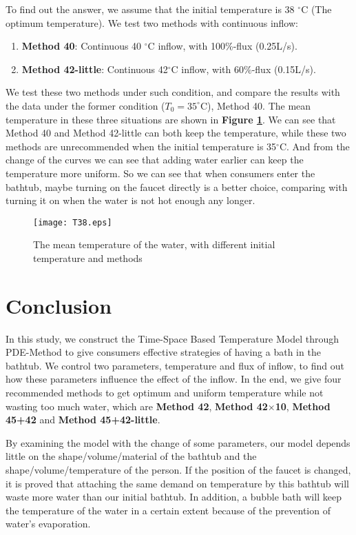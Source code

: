 \documentclass[12pt]{article}
\begin{document}
To find out the answer, we assume that the initial temperature is 38 $^\circ$C (The optimum
temperature). We test two methods with continuous inflow:
\begin{enumerate}[\qquad \bf 1.]
    \item \textbf{Method 40}: Continuous 40 $^\circ$C inflow, with 100\%-flux (0.25L/s).
    \item \textbf{Method 42-little}: Continuous 42$^\circ$C inflow, with 60\%-flux (0.15L/s).
\end{enumerate}
We test these two methods under such condition, and compare the results with the data under the
former condition ($T_0=35^\circ$C), Method 40. The mean temperature in these three situations are
shown in \textbf{Figure \ref{38}}. We can see that Method 40 and Method 42-little can both keep the
temperature, while these two methods are unrecommended when the initial temperature is 35$^\circ$C.
And from the change of the curves we can see that adding water earlier can keep the temperature more
uniform. So we can see that when consumers enter the bathtub, maybe turning on the faucet directly
is a better choice, comparing with turning it on when the water is not hot enough any longer.
\begin{figure}[!htbp]
\small
\centering
\texttt{[image: T38.eps]}
\caption{The mean temperature of the water, with different initial temperature and methods}
\label{38}
\end{figure}

\section{Conclusion}
In this study, we construct the Time-Space Based Temperature Model through PDE-Method to give
consumers effective strategies of having a bath in the bathtub. We control two parameters,
temperature and flux of inflow, to find out how these parameters influence the effect of the inflow.
In the end, we give four recommended methods to get optimum and uniform temperature while not
wasting too much water, which are \textbf{Method 42}, \textbf{Method 42$\times$10}, \textbf{Method
45+42} and \textbf{Method 45+42-little}.

By examining the model with the change of some parameters, our model depends little on the
shape/volume/material of the bathtub and the shape/volume/temperature of the person. If the position
of the faucet is changed, it is proved that attaching the same demand on temperature by this bathtub
will waste more water than our initial bathtub. In addition, a bubble bath will keep the temperature
of the water in a certain extent because of the prevention of water's evaporation.
\end{document}

